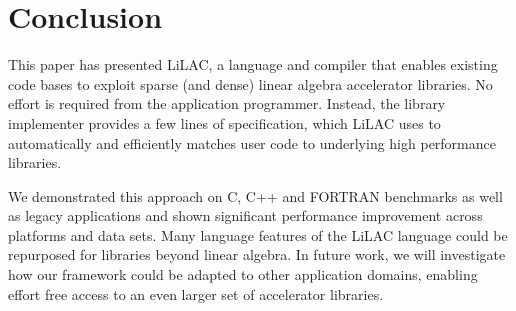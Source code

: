 \section{Conclusion}
\label{sec:conclusion}



This paper has presented LiLAC, a language and compiler that enables existing
code bases to exploit sparse (and dense) linear algebra accelerator libraries.
No effort is required from the application programmer.
Instead, the library implementer provides a few lines of specification, which
LiLAC uses to  automatically and efficiently matches  user code to
underlying high performance libraries.

We demonstrated this approach on  C, C++ and FORTRAN benchmarks as well as
legacy applications and shown significant performance improvement across
platforms and data sets.
Many language features of the LiLAC language could be repurposed for libraries
beyond linear algebra.
In future work, we will investigate how our framework could be adapted to other
application domains, enabling effort free access to an even larger set of
accelerator libraries.
